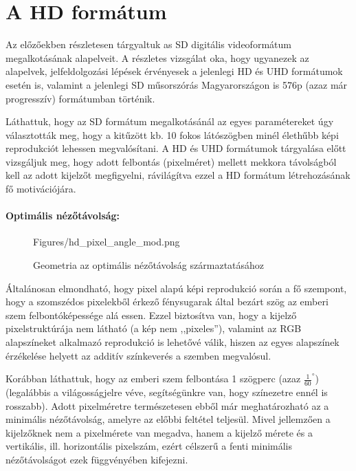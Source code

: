 \section{A HD formátum}

Az előzőekben részletesen tárgyaltuk as SD digitális videoformátum megalkotásának alapelveit.
A részletes vizsgálat oka, hogy ugyanezek az alapelvek, jelfeldolgozási lépések érvényesek a jelenlegi HD és UHD formátumok esetén is, valamint a jelenlegi SD műsorszórás Magyarországon is 576p (azaz már progresszív) formátumban történik.

Láthattuk, hogy az SD formátum megalkotásánál az egyes paramétereket úgy választották meg, hogy a kitűzött kb. 10 fokos látószögben minél élethűbb képi reprodukciót lehessen megvalósítani.
A HD és UHD formátumok tárgyalása előtt vizsgáljuk meg, hogy adott felbontás (pixelméret) mellett mekkora távolságból kell az adott kijelzőt megfigyelni, rávilágítva ezzel a HD formátum létrehozásának fő motivációjára.

\paragraph{Optimális nézőtávolság:\\}

\begin{figure}[]
	\centering
	\begin{overpic}[width = 0.67 \columnwidth ]{Figures/hd_pixel_angle_mod.png}
	\small
	\end{overpic}
	\caption{Geometria az optimális nézőtávolság származtatásához}
	\label{Fig:optimal_vd}
\end{figure}

Általánosan elmondható, hogy pixel alapú képi reprodukció során a fő szempont, hogy a szomszédos pixelekből érkező fénysugarak által bezárt szög az emberi szem felbontóképessége alá essen.
Ezzel biztosítva van, hogy a kijelző pixelstruktúrája nem látható (a kép nem ,,pixeles''), valamint az RGB alapszíneket alkalmazó reprodukció is lehetővé válik, hiszen az egyes alapszínek érzékelése helyett az additív színkeverés a szemben megvalósul.

Korábban láthattuk, hogy az emberi szem felbontása 1 szögperc (azaz $\frac{1}{60}^{\circ}$) (legalábbis a világosságjelre véve, segítségünkre van, hogy színezetre ennél is rosszabb).
Adott pixelméretre természetesen ebből már meghatározható az a minimális nézőtávolság, amelyre az előbbi feltétel teljesül.
Mivel jellemzően a kijelzőknek nem a pixelmérete van megadva, hanem a kijelző mérete és a vertikális, ill. horizontális pixelszám, ezért célszerű a fenti minimális nézőtávolságot ezek függvényében kifejezni.

